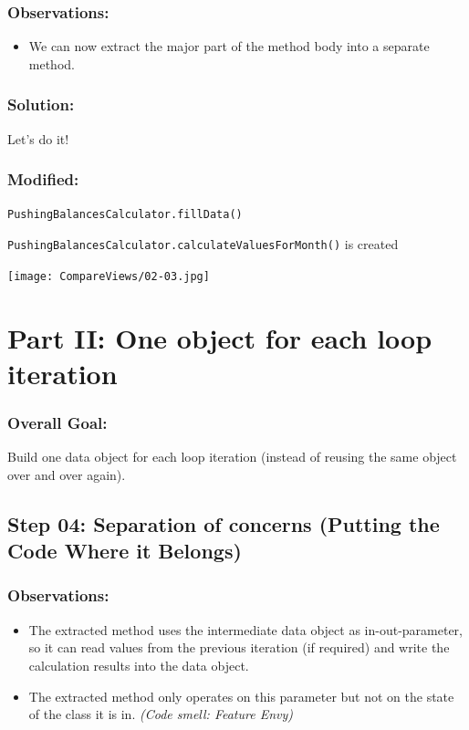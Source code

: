 \documentclass[a4paper,fleqn,titlepage,11pt]{article}
\begin{document}
\subsubsection*{Observations:}
\begin{itemize}
\item We can now extract the major part of the method body into a separate method.
\end{itemize}

\subsubsection*{Solution:}

Let's do it!

\subsubsection*{Modified:}

\texttt{PushingBalancesCalculator.fillData()}

\texttt{PushingBalancesCalculator.calculateValuesForMonth()} is created

\texttt{[image: CompareViews/02-03.jpg]}



\section*{Part II: One object for each loop iteration}

\subsubsection*{Overall Goal:}

Build one data object for each loop iteration (instead of reusing the same object over and over again).


\subsection*{Step 04: Separation of concerns (Putting the Code Where it Belongs)}

\subsubsection*{Observations:}
\begin{itemize}
\item The extracted method uses the intermediate data object as in-out-parameter, so it can read values from the previous iteration (if required) and write the calculation results into the data object.
\item The extracted method only operates on this parameter but not on the state of the class it is in. {\em (Code smell: Feature Envy)}
\end{itemize}
\end{document}
